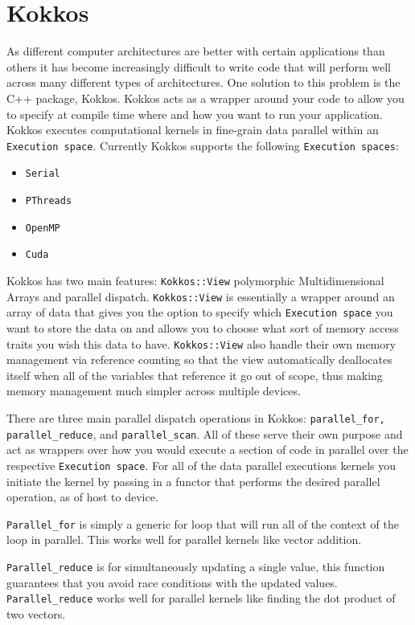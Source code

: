 \documentclass{ccr15}
\begin{document}
\section{Kokkos}
As different computer architectures are better with certain applications than others it has
become increasingly difficult to write code that will perform well across many different types of
architectures. One solution to this problem is the C++ package, Kokkos. Kokkos acts as a wrapper
around your code to allow you to specify at compile time where and how you want to run your
application. Kokkos executes computational kernels in fine-grain data parallel within an 
\texttt{Execution space}.
Currently Kokkos supports the following \texttt{Execution spaces}:
\begin{itemize}
\item \texttt{Serial}
\item \texttt{PThreads}\cite{ZAB:PThreads}
\item \texttt{OpenMP}\cite{ZAB:OpenMP}
\item \texttt{Cuda}\cite{ZAB:CUDA}
\end{itemize}

Kokkos has two main features: \texttt{Kokkos::View} polymorphic Multidimensional  Arrays and parallel dispatch.
  \texttt{Kokkos::View} is essentially a wrapper around
an array of data that gives you the option to specify which \texttt{Execution space} you want to store the
data on and allows you to choose what sort of memory access traits you wish this data to have.
\texttt{Kokkos::View}  also handle their own memory management via reference counting so that the view
automatically deallocates itself when all of the variables that reference it go out of scope,
thus making memory management much simpler across multiple devices.

There are three main parallel dispatch operations in Kokkos: \texttt{parallel\_for,}  \texttt{parallel\_reduce}, and \texttt{parallel\_scan}. 
All of these serve their own purpose and act as wrappers over how you would execute a section of 
code in parallel over the respective \texttt{Execution space}. 
For all of the data parallel executions kernels you initiate the kernel by passing in a functor 
that performs the desired parallel operation, as of  host to device.

\texttt{Parallel\_for} is simply a generic for loop that will run all of the context of the loop in
parallel. This works well for parallel kernels like vector addition. 

\texttt{Parallel\_reduce} is for
simultaneously updating a single value, this function guarantees that you avoid race conditions
with the updated values. \texttt{Parallel\_reduce} works well for parallel kernels like finding the dot
product of two vectors. 
\end{document}
